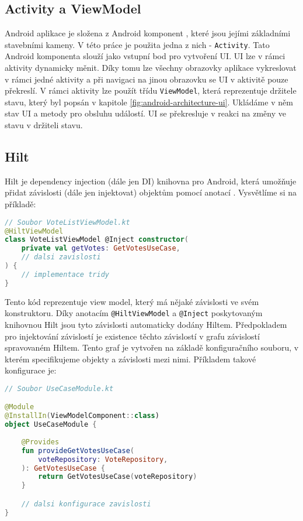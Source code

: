 \subsection *{Activity a ViewModel}
Android aplikace je složena z Android komponent \cite{android-components}, které jsou jejími základními stavebními kameny. V této práce je použita jedna z nich - \lstinline|Activity|. Tato Android komponenta slouží jako vstupní bod pro vytvoření UI. UI lze v rámci aktivity dynamicky měnit. Díky tomu lze všechny obrazovky aplikace vykreslovat v rámci jedné aktivity a při navigaci na jinou obrazovku se UI \linebreak v aktivitě pouze překreslí. V rámci aktivity lze použít třídu \lstinline|ViewModel|, která reprezentuje držitele stavu, který byl popsán v kapitole \ref{fig:android-architecture-ui}. Ukládáme v něm stav UI a metody pro obsluhu událostí. UI se překresluje v reakci na změny ve stavu v držiteli stavu. 

\subsection *{Hilt}
Hilt je dependency injection (dále jen DI) knihovna pro Android, která umožňuje přidat závislosti (dále jen injektovat) objektům pomocí anotací \cite{hilt}. Vysvětlíme si na příkladě:

\begin{lstlisting}[caption={Příklad použití DI pomocí knihovny Hilt}, label={lst:hilt-di}, tabsize=2, language=Kotlin]
// Soubor VoteListViewModel.kt
@HiltViewModel
class VoteListViewModel @Inject constructor(
	private val getVotes: GetVotesUseCase,
	// dalsi zavislosti
) {	
	// implementace tridy
}
\end{lstlisting}

\noindent Tento kód reprezentuje view model, který má nějaké závislosti ve svém konstruktoru. Díky anotacím \lstinline|@HiltViewModel| a \lstinline|@Inject| poskytovaným knihovnou Hilt jsou tyto závislosti automaticky dodány Hiltem. Předpokladem pro injektování závislostí je existence těchto závislostí v grafu závislostí spravovaném Hiltem. Tento graf je vytvořen na základě konfiguračního souboru, v kterém specifikujeme objekty a závislosti mezi nimi. Příkladem takové konfigurace je:

\begin{lstlisting}[caption={Ukázka konfigurace DI pro Hilt}, label={lst:hilt-config}, tabsize=2, language=Kotlin]
// Soubor UseCaseModule.kt

@Module
@InstallIn(ViewModelComponent::class)
object UseCaseModule {	
	
	@Provides
	fun provideGetVotesUseCase(
		voteRepository: VoteRepository,
	): GetVotesUseCase {
		return GetVotesUseCase(voteRepository)
	}

	// dalsi konfigurace zavislosti
}
\end{lstlisting}


